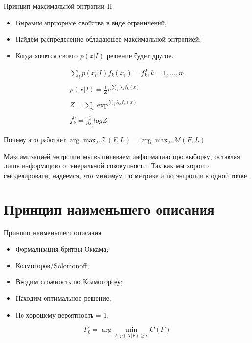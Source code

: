 \documentclass[14pt, fleqn, xcolor={dvipsnames, table}]{beamer}
\begin{document}
\begin{frame}{Принцип максимальной энтропии II}
\begin{itemize}
  \item Выразим априорные свойства в виде ограничений;
  \item Найдём распределение обладающее максимальной энтропией;
  \item Когда хочется своего $p(x|I)$ решение будет другое.
\end{itemize}
$$\begin{array}{l}
\sum_i p(x_i|I)f_k(x_i) = f_k^0, k = 1, \ldots, m \\
\\
p(x|I) = \frac{1}{Z}e^{\sum_k\lambda_kf_k(x)} \\
\\
Z = \sum_i\exp^{\sum_k\lambda_kf_k(x)} \\
\\
f_k^0 = \frac{\partial}{\partial\lambda_k}logZ
\end{array}$$
\end{frame}

\begin{frame}{Почему это работает} %
$\arg\max_{F} \mathcal{T}(F, L) = \arg\max_{F} \mathcal{M}(F, L)$

Максимизацией энтропии мы выпиливаем информацию про выборку, оставляя лишь информацию о генеральной совокупности. Так как мы хорошо смоделировали, надеемся, что минимум по метрике и по энтропии в одной точке.
\end{frame}

\section{Принцип наименьшего описания}

\begin{frame}{Принцип наименьшего описания}
\begin{itemize}
  \item Формализация бритвы Оккама;
  \item Колмогоров/Solomonoff;
  \item Вводим сложность по Колмогорову;
  \item Находим оптимальное решение; 
  \item По хорошему вероятность = 1.
\end{itemize}
$$
  F_0 = \arg\min_{F:p(X|F)\ge\epsilon} C(F)
$$

\end{frame}
\end{document}
